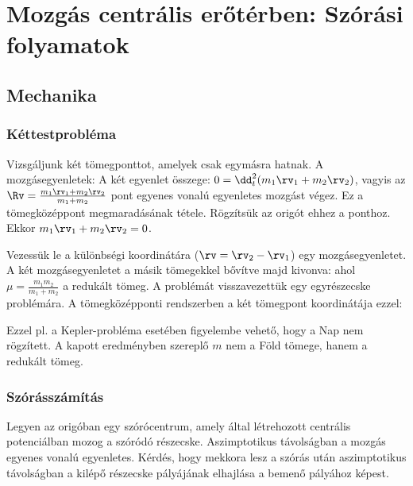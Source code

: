 \chapter{Mozg\'as centr\'alis er\H{o}t\'erben: Sz\'or\'asi folyamatok}
 
 \section{Mechanika} 
  
  \subsection{Kéttestprobléma} 
   
   Vizsgáljunk két tömegponttot, amelyek csak egymásra hatnak.
   A mozgásegyenletek:
   A két egyenlet összege: $0=\dd_t^2(m_1\rv_1+m_2\rv_2)$, vagyis az $\Rv=\frac{m_1\rv_1+m_2\rv_2}{m_1+m_2}$ pont egyenes vonalú egyenletes mozgást végez.
   Ez a tömegközéppont megmaradásának tétele.
   Rögzítsük az origót ehhez a ponthoz.
   Ekkor $m_1\rv_1+m_2\rv_2=0$.
   
   Vezessük le a különbségi koordinátára ($\rv=\rv_2-\rv_1$) egy mozgásegyenletet.
   A két mozgásegyenletet a másik tömegekkel bővítve majd kivonva:
   ahol $\mu=\frac{m_1 m_2}{m_1+m_2}$ a redukált tömeg.
   A problémát visszavezettük egy egyrészecske problémára.
   A tömegközépponti rendszerben a két tömegpont koordinátája ezzel:
   
   Ezzel pl. a Kepler-probléma esetében figyelembe vehető, hogy a Nap nem rögzített.
   A kapott eredményben szereplő $m$ nem a Föld tömege, hanem a redukált tömeg. 
   
  \subsection{Szórásszámítás}
   
   Legyen az origóban egy szórócentrum, amely által létrehozott centrális potenciálban mozog a szóródó részecske.
   Aszimptotikus távolságban a mozgás egyenes vonalú egyenletes.
   Kérdés, hogy mekkora lesz a szórás után aszimptotikus távolságban a kilépő részecske pályájának elhajlása a bemenő pályához képest. 
   
